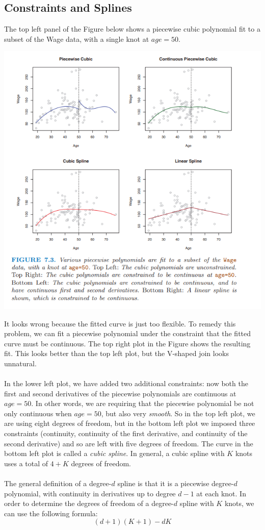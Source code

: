 \subsection{Constraints and Splines}
The top left panel of the Figure below shows a piecewise cubic polynomial fit to
a subset of the Wage data, with a single knot at $age=50$. 
\begin{center}
    \includegraphics[scale=0.6]{images/B-spline.png}
\end{center}
It  looks wrong because the fitted curve is just too flexible. To remedy this problem, we can fit a piecewise polynomial under the constraint that the fitted curve must be continuous. The top right plot in the Figure shows the resulting fit. This looks better than the top left plot, but the V-shaped join looks unnatural.\\\\
In the lower left plot, we have added two additional constraints: now both
the first and second derivatives of the piecewise polynomials are continuous at $age=50$. In other words, we are requiring that the piecewise polynomial
be not only continuous when $age=50$, but also very \textit{smooth}. So in the top left plot, we are using eight degrees of freedom, but in the bottom left plot we imposed three constraints (continuity, continuity of the first derivative, and continuity of the second derivative) and so are left with five degrees of freedom. The curve in the bottom left plot is called a \textit{cubic spline}. In general, a cubic spline with $K$ knots uses a total of $4 + K$ degrees of freedom.\\\\
The general definition of a degree-$d$ spline is that it is a piecewise degree-$d$ polynomial, with continuity in derivatives up to degree $d - 1$ at each knot. In order to determine the degrees of freedom of a degree-$d$ spline with $K$ knots, we can use the following formula:
\[(d+1)(K+1) - dK\]


